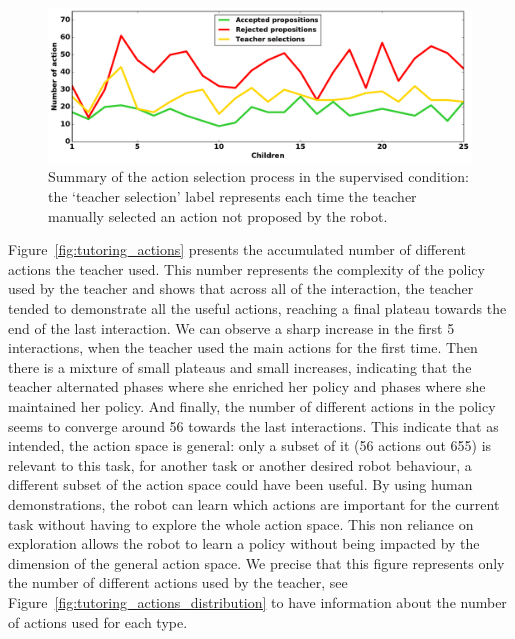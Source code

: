 \begin{figure}[ht]
	\includegraphics[width=1\linewidth]{./summary_supervision.pdf}
	\centering
	\caption{Summary of the action selection process in the supervised condition: the `teacher selection' label represents each time the teacher manually selected an action not proposed by the robot.}
	\label{fig:tutoring_supervision}
\end{figure}

Figure~\ref{fig:tutoring_actions} presents the accumulated number of different actions the teacher used. This number represents the complexity of the policy used by the teacher and shows that across all of the interaction, the teacher tended to demonstrate all the useful actions, reaching a final plateau towards the end of the last interaction. We can observe a sharp increase in the first 5 interactions, when the teacher used the main actions for the first time. Then there is a mixture of small plateaus and small increases, indicating that the teacher alternated phases where she enriched her policy and phases where she maintained her policy. And finally, the number of different actions in the policy seems to converge around 56 towards the last interactions. This indicate that as intended, the action space is general: only a subset of it (56 actions out 655) is relevant to this task, for another task or another desired robot behaviour, a different subset of the action space could have been useful. By using human demonstrations, the robot can learn which actions are important for the current task without having to explore the whole action space. This non reliance on exploration allows the robot to learn a policy without being impacted by the dimension of the general action space. We precise that this figure represents only the number of different actions used by the teacher, see Figure~\ref{fig:tutoring_actions_distribution} to have information about the number of actions used for each type.

